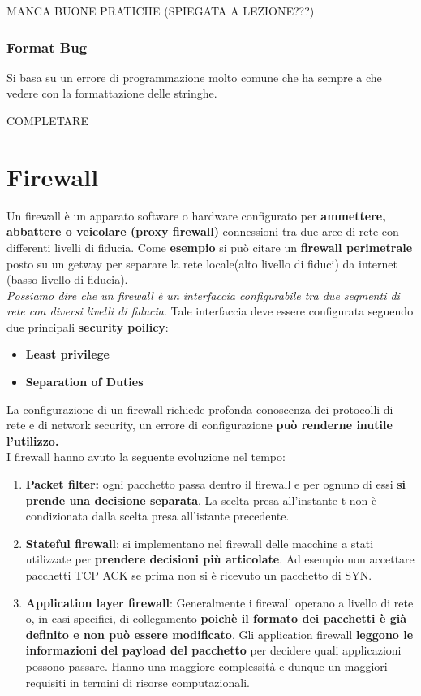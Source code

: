 \documentclass[12pt]{article}
\begin{document}
				MANCA BUONE PRATICHE (SPIEGATA A LEZIONE???)\\
				
			\subsubsection{Format Bug}
				Si basa su un errore di programmazione molto comune che ha sempre a che vedere con la formattazione delle stringhe.
				
				COMPLETARE
	\section{Firewall}
		Un firewall è un apparato software o hardware configurato per \textbf{ammettere, abbattere o veicolare (proxy firewall)} connessioni tra due aree di rete con differenti livelli di fiducia. Come \textbf{esempio} si può citare un \textbf{firewall perimetrale } posto su un getway per separare la rete locale(alto livello di fiduci) da internet (basso livello di fiducia).\\
		\textit{Possiamo dire che un firewall è un interfaccia configurabile tra due segmenti di rete con diversi livelli di fiducia}. Tale interfaccia deve essere configurata seguendo due principali \textbf{security poilicy}:
		\begin{itemize}
			\item \textbf{Least privilege}
			\item \textbf{Separation of Duties}
		\end{itemize}
		La configurazione di un firewall richiede profonda conoscenza dei protocolli di rete e di network security, un errore di configurazione \textbf{può renderne inutile l'utilizzo.}\\
		I firewall hanno avuto la seguente evoluzione nel tempo:
		\begin{enumerate}
			\item \textbf{Packet filter:} ogni pacchetto passa dentro il firewall e per ognuno di essi \textbf{si prende una decisione separata}. La scelta presa all'instante t non è condizionata dalla scelta presa all'istante precedente.
			\item \textbf{Stateful firewall}: si implementano nel firewall delle macchine a stati utilizzate per \textbf{prendere decisioni più articolate}. Ad esempio non accettare pacchetti TCP ACK se prima non si è ricevuto un pacchetto di SYN.
			\item \textbf{Application layer firewall}: Generalmente i firewall operano a livello di rete o, in casi specifici, di collegamento \textbf{poichè il formato dei pacchetti è già definito e non può essere modificato}. Gli application firewall \textbf{leggono le informazioni del payload del pacchetto} per decidere quali applicazioni possono passare. Hanno una maggiore complessità e dunque un maggiori requisiti in termini di risorse computazionali.
		\end{enumerate}
\end{document}
